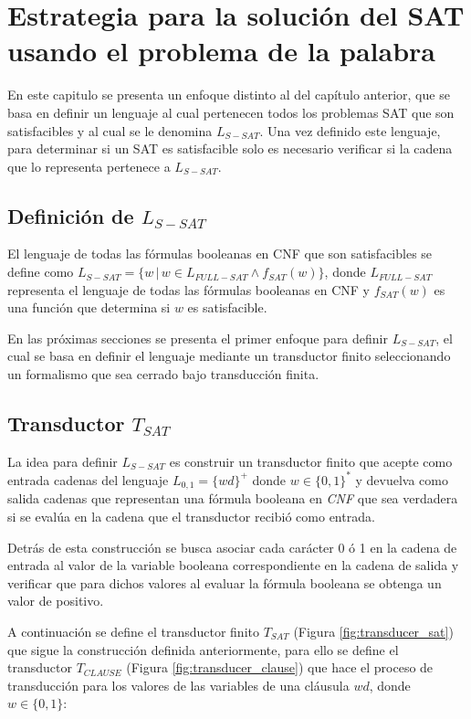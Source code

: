 \chapter{Estrategia para la solución del SAT usando el problema de la palabra}


En este capitulo se presenta un enfoque distinto al del capítulo anterior, que se basa en definir un lenguaje al cual
pertenecen todos los problemas SAT que son satisfacibles y al cual se le denomina $L_{S-SAT}$. Una vez definido este lenguaje, para determinar
si un SAT es satisfacible solo es necesario verificar si la cadena que lo representa pertenece a $L_{S-SAT}$.

\section{Definición de $L_{S-SAT}$}

El lenguaje de todas las fórmulas booleanas en CNF que son satisfacibles se define como $L_{S-SAT}=\{w\,|\,w \in L_{FULL-SAT} \wedge f_{SAT}(w)\}$,
donde $L_{FULL-SAT}$ representa el lenguaje de todas las fórmulas booleanas en CNF y $f_{SAT}(w)$ es una función que
determina si $w$ es satisfacible.

En las próximas secciones se presenta el primer enfoque para definir $L_{S-SAT}$, el cual se basa en definir
el lenguaje mediante un transductor finito seleccionando un formalismo que sea cerrado bajo transducción finita.
\section{Transductor $T_{SAT}$}

La idea para definir $L_{S-SAT}$ es construir un transductor finito que acepte como entrada cadenas del lenguaje $L_{0,1}=\{wd\}^+$ donde $w\in \{0,1\}^*$
y devuelva como salida cadenas que representan una fórmula booleana en \textit{CNF} que sea verdadera si se evalúa en la cadena que el transductor recibió como entrada.

Detrás de esta construcción se busca asociar cada carácter 0 ó 1 en la cadena de entrada al valor de la variable booleana correspondiente
en la cadena de salida y verificar que para dichos valores al evaluar la fórmula booleana se obtenga un valor de
positivo.

A continuación se define el transductor finito $T_{SAT}$ (Figura \ref{fig:transducer_sat}) que sigue la construcción definida anteriormente,
para ello se define el transductor $T_{CLAUSE}$ (Figura \ref{fig:transducer_clause}) que hace el proceso de transducción
para los valores de las variables de una cláusula $wd$, donde $w\in \{0,1\}$:

